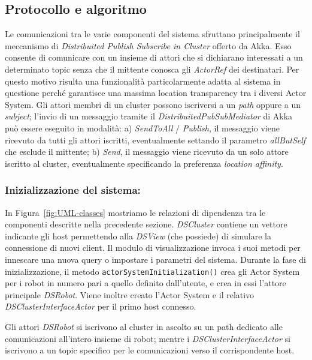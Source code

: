 \subsection{Protocollo e algoritmo}
\label{sec:protocols}

Le comunicazioni tra le varie componenti del sistema sfruttano
principalmente il meccanismo di
\emph{Distribuited Publish Subscribe in Cluster} offerto da Akka.
Esso consente di comunicare con un insieme di attori che si
dichiarano interessati a un determinato topic senza che il mittente
conosca gli \emph{ActorRef} dei destinatari. Per questo motivo
risulta una funzionalità particolarmente adatta al sistema in questione
perché garantisce una massima location transparency tra i diversi
Actor System.
Gli attori membri di un cluster possono iscriversi a un \emph{path}
oppure a un \emph{subject}; l'invio di un messaggio tramite il
\emph{DistribuitedPubSubMediator} di Akka può essere eseguito in
modalità: a) \emph{SendToAll} / \emph{Publish}, il messaggio viene
ricevuto da tutti gli attori iscritti, eventualmente settando il
parametro \emph{allButSelf} che esclude il mittente;
b) \emph{Send}, il messaggio viene ricevuto da un solo attore
iscritto al cluster, eventualmente specificando la preferenza
\emph{location affinity}.

\subsubsection*{Inizializzazione del sistema:}
In Figura~\ref{fig:UML-classes} mostriamo le relazioni di
dipendenza tra le componenti descritte nella precedente sezione.
\emph{DSCluster} contiene un vettore indicante gli host
permettendo alla \emph{DSView} (che possiede) di simulare
la connessione di nuovi client.
Il modulo di visualizzazione invoca i suoi metodi per innescare
una nuova query o impostare i parametri del sistema.
Durante la fase di inizializzazione,
il metodo \texttt{actorSystemInitialization()} crea gli Actor
System per i robot
in numero pari a quello definito dall'utente,
e crea in essi l'attore principale \emph{DSRobot}. Viene inoltre
creato l'Actor System e il relativo \emph{DSClusterInterfaceActor}
per il primo host connesso.

Gli attori \emph{DSRobot} si iscrivono al cluster in ascolto su un
path dedicato alle comunicazioni all'intero insieme di robot;
mentre i \emph{DSClusterInterfaceActor} si iscrivono a un topic
specifico per le comunicazioni verso il corrispondente host.

